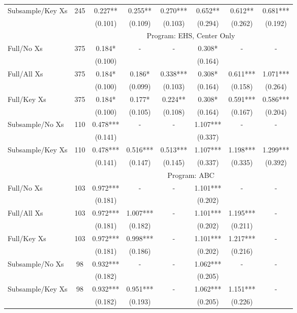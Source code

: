 \begin{tabular}{lccccccc}
Subsample/Key Xs & 245 & 0.227** & 0.255** & 0.270*** & 0.652** & 0.612** & 0.681*** \\
 &  & (0.101) & (0.109) & (0.103) & (0.294) & (0.262) & (0.192) \\
\midrule 
 &  & \multicolumn{6}{c}{Program: EHS, Center Only} \\
 \cmidrule(lr){3-8} 
Full/No Xs & 375 & 0.184* & - & - & 0.308* & - & - \\
 &  & (0.100) &  &  & (0.164) &  &  \\
Full/All Xs & 375 & 0.184* & 0.186* & 0.338*** & 0.308* & 0.611*** & 1.071*** \\
 &  & (0.100) & (0.099) & (0.103) & (0.164) & (0.158) & (0.264) \\
Full/Key Xs & 375 & 0.184* & 0.177* & 0.224** & 0.308* & 0.591*** & 0.586*** \\
 &  & (0.100) & (0.105) & (0.108) & (0.164) & (0.167) & (0.204) \\
Subsample/No Xs & 110 & 0.478*** & - & - & 1.107*** & - & - \\
 &  & (0.141) &  &  & (0.337) &  &  \\
Subsample/Key Xs & 110 & 0.478*** & 0.516*** & 0.513*** & 1.107*** & 1.198*** & 1.299*** \\
 &  & (0.141) & (0.147) & (0.145) & (0.337) & (0.335) & (0.392) \\
\midrule 
 &  & \multicolumn{6}{c}{Program: ABC} \\
 \cmidrule(lr){3-8} 
Full/No Xs & 103 & 0.972*** & - & - & 1.101*** & - & - \\
 &  & (0.181) &  &  & (0.202) &  &  \\
Full/All Xs & 103 & 0.972*** & 1.007*** & - & 1.101*** & 1.195*** & - \\
 &  & (0.181) & (0.182) &  & (0.202) & (0.211) &  \\
Full/Key Xs & 103 & 0.972*** & 0.998*** & - & 1.101*** & 1.217*** & - \\
 &  & (0.181) & (0.186) &  & (0.202) & (0.216) &  \\
Subsample/No Xs & 98 & 0.932*** & - & - & 1.062*** & - & - \\
 &  & (0.182) &  &  & (0.205) &  &  \\
Subsample/Key Xs & 98 & 0.932*** & 0.951*** & - & 1.062*** & 1.151*** & - \\
 &  & (0.182) & (0.193) &  & (0.205) & (0.226) &  \\
\midrule 
\bottomrule 
\end{tabular}
